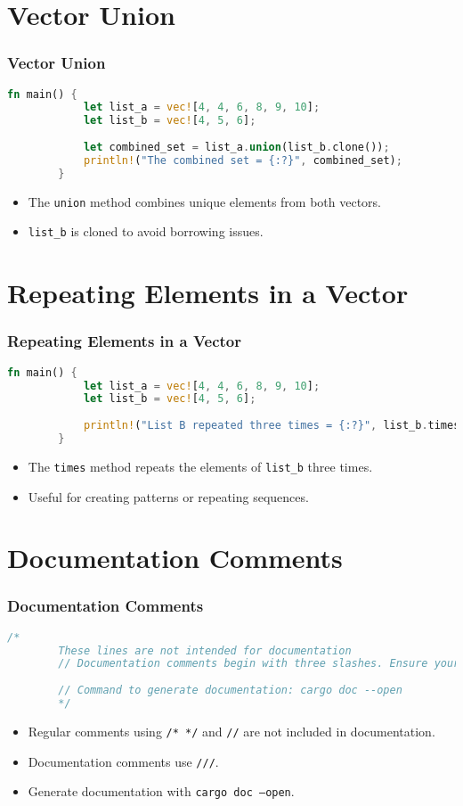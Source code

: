 \documentclass[aspectratio=169, table]{beamer}
\begin{document}
\section{Vector Union}
\begin{frame}[fragile]
	\frametitle{Vector Union}
	\begin{lstlisting}[language=Rust]
		fn main() {
			let list_a = vec![4, 4, 6, 8, 9, 10];
			let list_b = vec![4, 5, 6];
			
			let combined_set = list_a.union(list_b.clone());
			println!("The combined set = {:?}", combined_set);
		}
	\end{lstlisting}
	\begin{itemize}
		\item The \texttt{union} method combines unique elements from both vectors.
		\item \texttt{list\_b} is cloned to avoid borrowing issues.
	\end{itemize}
\end{frame}

\section{Repeating Elements in a Vector}
\begin{frame}[fragile]
	\frametitle{Repeating Elements in a Vector}
	\begin{lstlisting}[language=Rust]
		fn main() {
			let list_a = vec![4, 4, 6, 8, 9, 10];
			let list_b = vec![4, 5, 6];
			
			println!("List B repeated three times = {:?}", list_b.times(3));
		}
	\end{lstlisting}
	\begin{itemize}
		\item The \texttt{times} method repeats the elements of \texttt{list\_b} three times.
		\item Useful for creating patterns or repeating sequences.
	\end{itemize}
\end{frame}

	\section{Documentation Comments}
\begin{frame}[fragile]
	\frametitle{Documentation Comments}
	\begin{lstlisting}[language=Rust]
		/* 
		These lines are not intended for documentation
		// Documentation comments begin with three slashes. Ensure your code is error-free and well-documented before publishing.
		
		// Command to generate documentation: cargo doc --open
		*/
	\end{lstlisting}
	\begin{itemize}
		\item Regular comments using \texttt{/* */} and \texttt{//} are not included in documentation.
		\item Documentation comments use \texttt{///}.
		\item Generate documentation with \texttt{cargo doc --open}.
	\end{itemize}
\end{frame}
\end{document}
